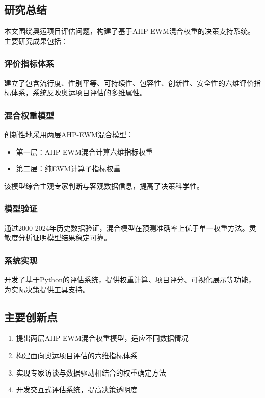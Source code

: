 
\subsection{研究总结}

本文围绕奥运项目评估问题，构建了基于AHP-EWM混合权重的决策支持系统。主要研究成果包括：

\subsubsection{评价指标体系}

建立了包含流行度、性别平等、可持续性、包容性、创新性、安全性的六维评价指标体系，系统反映奥运项目评估的多维属性。

\subsubsection{混合权重模型}

创新性地采用两层AHP-EWM混合模型：
\begin{itemize}
\item 第一层：AHP-EWM混合计算六维指标权重
\item 第二层：纯EWM计算子指标权重
\end{itemize}

该模型综合主观专家判断与客观数据信息，提高了决策科学性。

\subsubsection{模型验证}

通过2000-2024年历史数据验证，混合模型在预测准确率上优于单一权重方法。灵敏度分析证明模型结果稳定可靠。

\subsubsection{系统实现}

开发了基于Python的评估系统，提供权重计算、项目评分、可视化展示等功能，为实际决策提供工具支持。

\subsection{主要创新点}

\begin{enumerate}
\item 提出两层AHP-EWM混合权重模型，适应不同数据情况
\item 构建面向奥运项目评估的六维指标体系
\item 实现专家访谈与数据驱动相结合的权重确定方法
\item 开发交互式评估系统，提高决策透明度
\end{enumerate}

